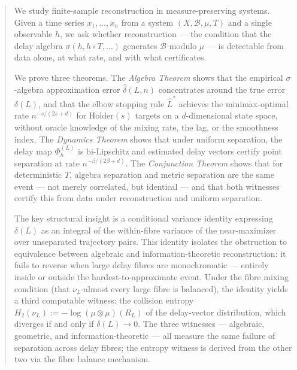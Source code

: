 
\maketitle

\begin{abstract}
We study finite-sample reconstruction in measure-preserving systems.
Given a time series $x_1,\ldots,x_n$ from a system $(X,\mathcal{B},\mu,T)$
and a single observable $h$, we ask whether reconstruction --- the condition
that the delay algebra $\sigma(h, h\circ T, \ldots)$ generates $\mathcal{B}$
modulo $\mu$ --- is detectable from data alone, at what rate, and with what
certificates.

We prove three theorems.
The \emph{Algebra Theorem} shows that the empirical $\sigma$-algebra
approximation error $\hat\delta(L,n)$ concentrates around the true error
$\delta(L)$, and that the elbow stopping rule $\hat{L}^*$ achieves the
minimax-optimal rate $n^{-s/(2s+d)}$ for $\mathrm{H\ddot{o}lder}(s)$ targets
on a $d$-dimensional state space, without oracle knowledge of the mixing rate,
the lag, or the smoothness index.
The \emph{Dynamics Theorem} shows that under uniform separation, the delay
map $\Phi_h^{(L)}$ is bi-Lipschitz and estimated delay vectors certify point
separation at rate $n^{-\beta/(2\beta+d)}$.
The \emph{Conjunction Theorem} shows that for deterministic $T$, algebra
separation and metric separation are the same event --- not merely correlated,
but identical --- and that both witnesses certify this from data under
reconstruction and uniform separation.

The key structural insight is a conditional variance identity expressing
$\delta(L)$ as an integral of the within-fibre variance of the near-maximizer
over unseparated trajectory pairs.
This identity isolates the obstruction to equivalence between algebraic and
information-theoretic reconstruction: it fails to reverse when large delay
fibres are monochromatic --- entirely inside or outside the hardest-to-approximate
event.
Under the fibre mixing condition (that $\nu_L$-almost every large fibre is
balanced), the identity yields a third computable witness: the collision entropy
$H_2(\nu_L) := -\log(\mu\otimes\mu)(R_L)$ of the delay-vector distribution,
which diverges if and only if $\delta(L) \to 0$.
The three witnesses --- algebraic, geometric, and information-theoretic ---
all measure the same failure of separation across delay fibres; the entropy
witness is derived from the other two via the fibre balance mechanism.
\end{abstract}

